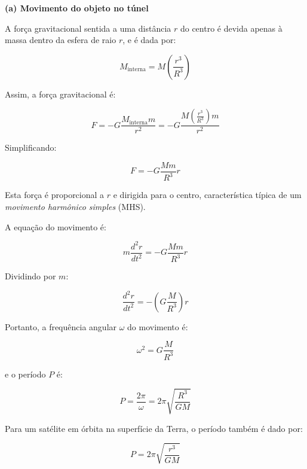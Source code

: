\documentclass[a4paper,12pt]{article}
\begin{document}
\begin{flushleft}
\textbf{(a) Movimento do objeto no túnel}

A força gravitacional sentida a uma distância \( r \) do centro é devida apenas à massa dentro da esfera de raio \( r \), e é dada por:

\begin{equation}
\boxed{M_{\text{interna}} = M \left( \frac{r^3}{R^3} \right)}
\end{equation}

Assim, a força gravitacional é:

\begin{equation}
F = - G \frac{M_{\text{interna}} m}{r^2} = -G \frac{M \left( \frac{r^3}{R^3} \right) m}{r^2}
\end{equation}

Simplificando:

\begin{equation}
\boxed{F = -G \frac{M m}{R^3} r}
\end{equation}

Esta força é proporcional a \( r \) e dirigida para o centro, característica típica de um \textit{movimento harmônico simples} (MHS).

A equação do movimento é:

\begin{equation}
\boxed{
m \frac{d^2r}{dt^2} = -G \frac{M m}{R^3} r
}
\end{equation}

Dividindo por \( m \):

\begin{equation}
\frac{d^2r}{dt^2} = -\left( G \frac{M}{R^3} \right) r
\end{equation}

Portanto, a frequência angular \( \omega \) do movimento é:

\begin{equation}
\omega^2 = G \frac{M}{R^3}
\end{equation}

e o período \( P \) é:

\begin{equation}
P = \frac{2\pi}{\omega} = 2\pi \sqrt{\frac{R^3}{G M}}
\end{equation}

\vspace{0.5cm}

Para um satélite em órbita na superfície da Terra, o período também é dado por:

\begin{equation}
P = 2\pi \sqrt{\frac{r^3}{G M}}
\end{equation}


\end{flushleft}
\end{document}
